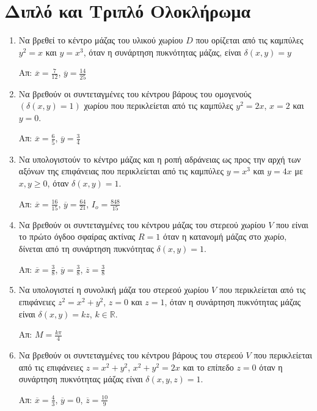 




\pagestyle{askhseis}



\begin{center}
  \minibox{\bfseries\large \textcolor{Col1}{Ασκήσεις στα Υλικά Χωρία}}
\end{center}

\vspace{\baselineskip}

\section*{Διπλό και Τριπλό Ολοκλήρωμα}


\begin{enumerate}
  \item Να βρεθεί το κέντρο μάζας του υλικού χωρίου $D$ που ορίζεται από τις καμπύλες 
    $y^{2}=x$ και $y=x^{3}$, όταν η συνάρτηση πυκνότητας μάζας, είναι $\delta(x,y)=y$

  \hfill Απ: $\overline{x}=\frac{7}{12}$, $\overline{y}=\frac{14}{25}$

  \item Να βρεθούν οι συντεταγμένες του κέντρου βάρους του ομογενούς $(\delta(x,y)=1)$ 
    χωρίου που περικλείεται από τις καμπύλες $y^{2}=2x$, $x=2$ και $y=0$.

  \hfill Απ: $\overline{x}=\frac{6}{5}$, $\overline{y}=\frac{3}{4}$

  \item  Να υπολογιστούν το κέντρο μάζας και η ροπή αδράνειας ως προς την αρχή των 
    αξόνων της επιφάνειας που περικλείεται από τις καμπύλες $y=x^{3}$ και  $y=4x$ με 
    $x,y\geq 0$, όταν $\delta(x,y)=1$.

  \hfill Απ: $\overline{x}=\frac{16}{15}$, $\overline{y}=\frac{64}{21}$, 
  $I_{o}=\frac{848}{15}$

  \item Να βρεθούν οι συντεταγμένες του κέντρου μάζας του στερεού χωρίου $V$ που 
    είναι το πρώτο όγδοο σφαίρας ακτίνας $R=1$ όταν η κατανομή μάζας στο χωρίο, 
    δίνεται από τη συνάρτηση πυκνότητας $\delta(x,y)=1$.

  \hfill Απ: $\overline{x}=\frac{3}{8}$, $\overline{y}=\frac{3}{8}$, 
  $\overline{z}=\frac{3}{8}$

  \item Να υπολογιστεί η συνολική μάζα του στερεού χωρίου $V$ που περικλείεται 
    από τις επιφάνειες $z^{2}=x^{2}+y^{2}$, $z=0$ και $z=1$, όταν η 
    συνάρτηση πυκνότητας μάζας είναι $\delta(x,y)=kz$, $k\in\mathbb{R}$.

  \hfill Απ: $M=\frac{k\pi}{4}$

  \item Να βρεθούν οι συντεταγμένες του κέντρου βάρους του στερεού $V$ που 
    περικλείεται από τις επιφάνειες $z=x^{2}+y^{2}$, $x^{2}+y^{2}=2x$ και το επίπεδο 
    $z=0$ όταν η συνάρτηση πυκνότητας μάζας είναι $\delta(x,y,z)=1$.

  \hfill Απ: $\overline{x}=\frac{4}{3}$, $\overline{y}=0$, $\overline{z}=\frac{10}{9}$
\end{enumerate}




